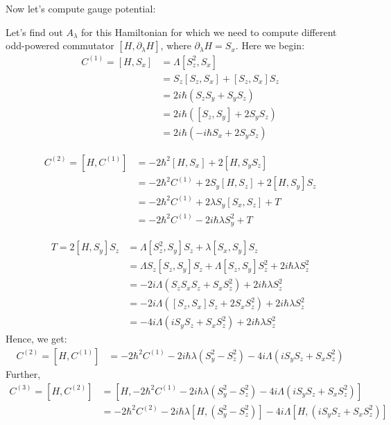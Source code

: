 \documentclass[11pt,a4paper]{article}
\begin{document}
Now let's compute gauge potential:

Let's find out $A_{\lambda}$ for this Hamiltonian for which we need to compute different odd-powered commutator $[H, \partial_{\lambda} H]$, where $\partial_{\lambda} H=S_x$. Here we begin:
\begin{align*}
C^{(1)}=[H,S_x] &= \Lambda  [S_z^2, S_x] \\
&= S_z[S_z, S_x] + [S_z, S_x] S_z \\
&= 2i \hbar (S_z S_y + S_y S_z) \\
&=2i \hbar ([S_z, S_y] +  2 S_y S_z)\\
&=2i \hbar (- i \hbar S_x +  2 S_y S_z)
\end{align*}

\begin{align*}
C^{(2)}=[H,C^{(1)}] &=    -2 \hbar^2 [H,  S_x]  + 2[ H,   S_y S_z] \\
&= -2 \hbar^2 C^{(1)}  + 2 S_y[ H,    S_z] + 2[ H,   S_y ]S_z\\
&= -2 \hbar^2 C^{(1)}  + 2 \lambda S_y [ S_x,    S_z] + T\\
&= -2 \hbar^2 C^{(1)}  - 2i \hbar \lambda S_y^2  + T
\end{align*}

\begin{align*}
T=2[ H,   S_y ]S_z &= \Lambda [S_z^2, S_y]S_z + \lambda   [S_x, S_y]S_z   \\
 &=   \Lambda S_z[S_z, S_y]S_z+\Lambda [S_z, S_y]S_z^2 + 2 i \hbar \lambda   S_z^2   \\
  &=  -2i \Lambda  ( S_z S_x S_z+ S_x S_z^2) + 2 i \hbar \lambda   S_z^2   \\
    &=  -2i \Lambda  ( [S_z, S_x] S_z+ 2 S_x S_z^2) + 2 i \hbar \lambda   S_z^2   \\
        &=  -4i \Lambda  ( i S_y S_z+  S_x S_z^2) + 2 i \hbar \lambda   S_z^2   
\end{align*}
Hence, we get:
\begin{align*}
C^{(2)}=[H,C^{(1)}]  &= -2 \hbar^2 C^{(1)}  - 2i \hbar \lambda (S_y^2 -S_z^2)  -4i \Lambda  ( i S_y S_z+  S_x S_z^2) 
\end{align*}
Further, 
\begin{align*}
C^{(3)}=[H,C^{(2)}] &= [H,-2 \hbar^2 C^{(1)}  - 2i \hbar \lambda (S_y^2 -S_z^2)  -4i \Lambda  ( i S_y S_z+  S_x S_z^2)] \\
&= -2 \hbar^2  C^{(2)} - 2i \hbar \lambda [H,(S_y^2 -S_z^2)]  -4i \Lambda  [H,( i S_y S_z+  S_x S_z^2)] 
\end{align*}
\end{document}
